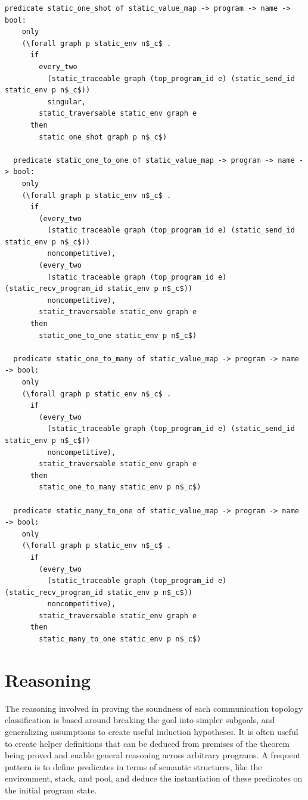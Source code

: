 \documentclass{article}
\begin{document}
\begin{lstlisting}[language=logic, mathescape]
  predicate static_one_shot of static_value_map -> program -> name -> bool:
    only
    (\forall graph p static_env n$_c$ .
      if
        every_two
          (static_traceable graph (top_program_id e) (static_send_id static_env p n$_c$))
          singular,
        static_traversable static_env graph e
      then
        static_one_shot graph p n$_c$)

  predicate static_one_to_one of static_value_map -> program -> name -> bool:
    only
    (\forall graph p static_env n$_c$ .
      if
        (every_two
          (static_traceable graph (top_program_id e) (static_send_id static_env p n$_c$))
          noncompetitive), 
        (every_two
          (static_traceable graph (top_program_id e) (static_recv_program_id static_env p n$_c$))
          noncompetitive), 
        static_traversable static_env graph e
      then
        static_one_to_one static_env p n$_c$)

  predicate static_one_to_many of static_value_map -> program -> name -> bool:
    only
    (\forall graph p static_env n$_c$ .
      if
        (every_two
          (static_traceable graph (top_program_id e) (static_send_id static_env p n$_c$))
          noncompetitive),
        static_traversable static_env graph e
      then
        static_one_to_many static_env p n$_c$) 

  predicate static_many_to_one of static_value_map -> program -> name -> bool:
    only
    (\forall graph p static_env n$_c$ .
      if
        (every_two
          (static_traceable graph (top_program_id e) (static_recv_program_id static_env p n$_c$))
          noncompetitive),
        static_traversable static_env graph e
      then
        static_many_to_one static_env p n$_c$) 
\end{lstlisting}

\section{Reasoning}
The reasoning involved in proving the soundness of each communication topology classification
is based around breaking the goal into simpler subgoals, and generalizing assumptions to create
useful induction hypotheses.  It is often useful to
create helper definitions that can be deduced
from premises of the theorem being proved and enable
general reasoning across arbitrary programs.
A frequent pattern is to define
predicates in terms of semantic structures, like the environment, stack, and pool, and deduce 
the instantiation of these predicates on the initial program state. 
\end{document}
